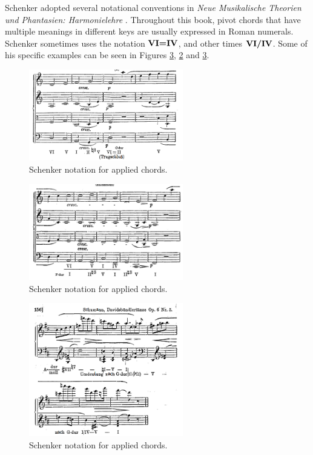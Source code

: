 Schenker adopted several notational conventions in \emph{Neue Musikalische Theorien und Phantasien: Harmonielehre} \parencite{schenker1906neue}.
Throughout this book, pivot chords that have multiple meanings in different keys are usually expressed in Roman numerals.
Schenker sometimes uses the notation $\textbf{VI=IV}\relax\relax$, and other times $\textbf{VI/IV}\relax\relax$.
Some of his specific examples can be seen in Figures \ref{fig:schenker1906neue190}, \ref{fig:schenker1906neue079} and \ref{fig:schenker1906neue190}.

\begin{figure}[h!]
    \centering
    \includegraphics[width=0.6\textwidth]{figures/chapter/2/primary_sources/schenker1906neue078.png}
    \caption{Schenker notation for applied chords.}
    \label{fig:schenker1906neue078}
\end{figure}

\begin{figure}[h!]
    \centering
    \includegraphics[width=0.6\textwidth]{figures/chapter/2/primary_sources/schenker1906neue079.png}
    \caption{Schenker notation for applied chords.}
    \label{fig:schenker1906neue079}
\end{figure}

\begin{figure}[h!]
    \centering
    \includegraphics[width=0.6\textwidth]{figures/chapter/2/primary_sources/schenker1906neue190.png}
    \caption{Schenker notation for applied chords.}
    \label{fig:schenker1906neue190}
\end{figure}

